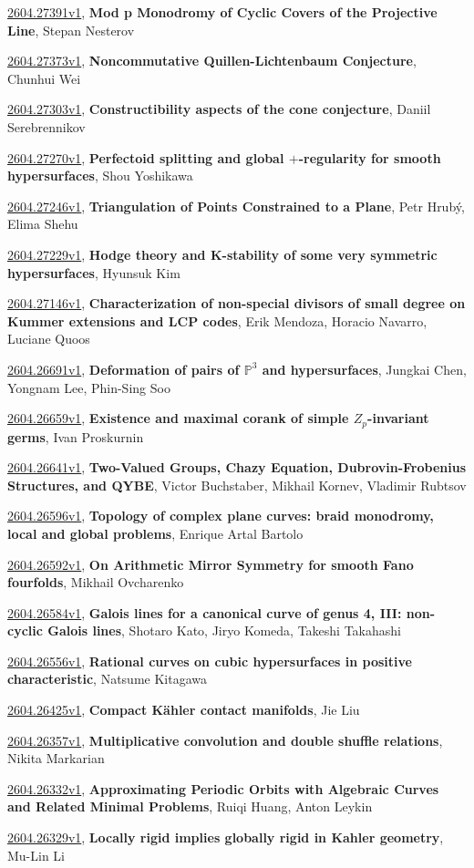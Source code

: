 \documentclass[9pt, a4paper]{article}
\theoremstyle{plain}
\theoremstyle{definition}
\theoremstyle{remark}
\newcommand{\arxiv}[3]{\href{https://arxiv.org/abs/#1}{#1}, \textbf{\textcolor{arxivblue}{#2}}, #3}
\begin{document}
\arxiv{2604.27391v1}{Mod p Monodromy of Cyclic Covers of the Projective Line}{Stepan Nesterov}

\arxiv{2604.27373v1}{Noncommutative Quillen-Lichtenbaum Conjecture}{Chunhui Wei}

\arxiv{2604.27303v1}{Constructibility aspects of the cone conjecture}{Daniil Serebrennikov}

\arxiv{2604.27270v1}{Perfectoid splitting and global $+$-regularity for smooth hypersurfaces}{Shou Yoshikawa}

\arxiv{2604.27246v1}{Triangulation of Points Constrained to a Plane}{Petr Hrubý, Elima Shehu}

\arxiv{2604.27229v1}{Hodge theory and K-stability of some very symmetric hypersurfaces}{Hyunsuk Kim}

\arxiv{2604.27146v1}{Characterization of non-special divisors of small degree on Kummer extensions and LCP codes}{Erik Mendoza, Horacio Navarro, Luciane Quoos}

\arxiv{2604.26691v1}{Deformation of pairs of $\mathbb{P}^3$ and hypersurfaces}{Jungkai Chen, Yongnam Lee, Phin-Sing Soo}

\arxiv{2604.26659v1}{Existence and maximal corank of simple $Z_p$-invariant germs}{Ivan Proskurnin}

\arxiv{2604.26641v1}{Two-Valued Groups, Chazy Equation, Dubrovin-Frobenius Structures, and QYBE}{Victor Buchstaber, Mikhail Kornev, Vladimir Rubtsov}

\arxiv{2604.26596v1}{Topology of complex plane curves: braid monodromy, local and global problems}{Enrique Artal Bartolo}

\arxiv{2604.26592v1}{On Arithmetic Mirror Symmetry for smooth Fano fourfolds}{Mikhail Ovcharenko}

\arxiv{2604.26584v1}{Galois lines for a canonical curve of genus 4, III: non-cyclic Galois lines}{Shotaro Kato, Jiryo Komeda, Takeshi Takahashi}

\arxiv{2604.26556v1}{Rational curves on cubic hypersurfaces in positive characteristic}{Natsume Kitagawa}

\arxiv{2604.26425v1}{Compact Kähler contact manifolds}{Jie Liu}

\arxiv{2604.26357v1}{Multiplicative convolution and double shuffle relations}{Nikita Markarian}

\arxiv{2604.26332v1}{Approximating Periodic Orbits with Algebraic Curves and Related Minimal Problems}{Ruiqi Huang, Anton Leykin}

\arxiv{2604.26329v1}{Locally rigid implies globally rigid in Kahler geometry}{Mu-Lin Li}
\end{document}
